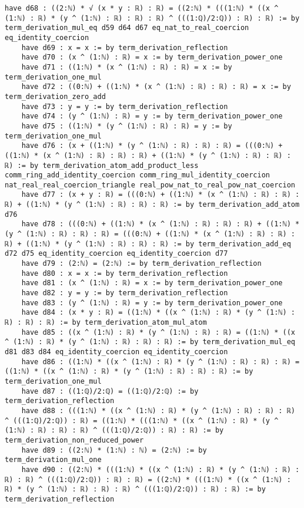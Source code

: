 \documentclass{article}
\begin{document}
\begin{tcolorbox}[colback=white!10, width=\linewidth]
\begin{lstlisting}[language=Lean4]
    have d68 : ((2:ℕ) * √ (x * y : ℝ) : ℝ) = ((2:ℕ) * (((1:ℕ) * ((x ^ (1:ℕ) : ℝ) * (y ^ (1:ℕ) : ℝ) : ℝ) : ℝ) ^ (((1:ℚ)/2:ℚ)) : ℝ) : ℝ) := by term_derivation_mul_eq d59 d64 d67 eq_nat_to_real_coercion eq_identity_coercion
    have d69 : x = x := by term_derivation_reflection
    have d70 : (x ^ (1:ℕ) : ℝ) = x := by term_derivation_power_one
    have d71 : ((1:ℕ) * (x ^ (1:ℕ) : ℝ) : ℝ) = x := by term_derivation_one_mul
    have d72 : ((0:ℕ) + ((1:ℕ) * (x ^ (1:ℕ) : ℝ) : ℝ) : ℝ) = x := by term_derivation_zero_add
    have d73 : y = y := by term_derivation_reflection
    have d74 : (y ^ (1:ℕ) : ℝ) = y := by term_derivation_power_one
    have d75 : ((1:ℕ) * (y ^ (1:ℕ) : ℝ) : ℝ) = y := by term_derivation_one_mul
    have d76 : (x + ((1:ℕ) * (y ^ (1:ℕ) : ℝ) : ℝ) : ℝ) = (((0:ℕ) + ((1:ℕ) * (x ^ (1:ℕ) : ℝ) : ℝ) : ℝ) + ((1:ℕ) * (y ^ (1:ℕ) : ℝ) : ℝ) : ℝ) := by term_derivation_atom_add_product_less comm_ring_add_identity_coercion comm_ring_mul_identity_coercion nat_real_real_coercion_triangle real_pow_nat_to_real_pow_nat_coercion
    have d77 : (x + y : ℝ) = (((0:ℕ) + ((1:ℕ) * (x ^ (1:ℕ) : ℝ) : ℝ) : ℝ) + ((1:ℕ) * (y ^ (1:ℕ) : ℝ) : ℝ) : ℝ) := by term_derivation_add_atom d76
    have d78 : (((0:ℕ) + ((1:ℕ) * (x ^ (1:ℕ) : ℝ) : ℝ) : ℝ) + ((1:ℕ) * (y ^ (1:ℕ) : ℝ) : ℝ) : ℝ) = (((0:ℕ) + ((1:ℕ) * (x ^ (1:ℕ) : ℝ) : ℝ) : ℝ) + ((1:ℕ) * (y ^ (1:ℕ) : ℝ) : ℝ) : ℝ) := by term_derivation_add_eq d72 d75 eq_identity_coercion eq_identity_coercion d77
    have d79 : (2:ℕ) = (2:ℕ) := by term_derivation_reflection
    have d80 : x = x := by term_derivation_reflection
    have d81 : (x ^ (1:ℕ) : ℝ) = x := by term_derivation_power_one
    have d82 : y = y := by term_derivation_reflection
    have d83 : (y ^ (1:ℕ) : ℝ) = y := by term_derivation_power_one
    have d84 : (x * y : ℝ) = ((1:ℕ) * ((x ^ (1:ℕ) : ℝ) * (y ^ (1:ℕ) : ℝ) : ℝ) : ℝ) := by term_derivation_atom_mul_atom
    have d85 : ((x ^ (1:ℕ) : ℝ) * (y ^ (1:ℕ) : ℝ) : ℝ) = ((1:ℕ) * ((x ^ (1:ℕ) : ℝ) * (y ^ (1:ℕ) : ℝ) : ℝ) : ℝ) := by term_derivation_mul_eq d81 d83 d84 eq_identity_coercion eq_identity_coercion
    have d86 : ((1:ℕ) * ((x ^ (1:ℕ) : ℝ) * (y ^ (1:ℕ) : ℝ) : ℝ) : ℝ) = ((1:ℕ) * ((x ^ (1:ℕ) : ℝ) * (y ^ (1:ℕ) : ℝ) : ℝ) : ℝ) := by term_derivation_one_mul
    have d87 : ((1:ℚ)/2:ℚ) = ((1:ℚ)/2:ℚ) := by term_derivation_reflection
    have d88 : (((1:ℕ) * ((x ^ (1:ℕ) : ℝ) * (y ^ (1:ℕ) : ℝ) : ℝ) : ℝ) ^ (((1:ℚ)/2:ℚ)) : ℝ) = ((1:ℕ) * (((1:ℕ) * ((x ^ (1:ℕ) : ℝ) * (y ^ (1:ℕ) : ℝ) : ℝ) : ℝ) ^ (((1:ℚ)/2:ℚ)) : ℝ) : ℝ) := by term_derivation_non_reduced_power
    have d89 : ((2:ℕ) * (1:ℕ) : ℕ) = (2:ℕ) := by term_derivation_mul_one
    have d90 : ((2:ℕ) * (((1:ℕ) * ((x ^ (1:ℕ) : ℝ) * (y ^ (1:ℕ) : ℝ) : ℝ) : ℝ) ^ (((1:ℚ)/2:ℚ)) : ℝ) : ℝ) = ((2:ℕ) * (((1:ℕ) * ((x ^ (1:ℕ) : ℝ) * (y ^ (1:ℕ) : ℝ) : ℝ) : ℝ) ^ (((1:ℚ)/2:ℚ)) : ℝ) : ℝ) := by term_derivation_reflection

\end{lstlisting}
\end{tcolorbox}
\end{document}

